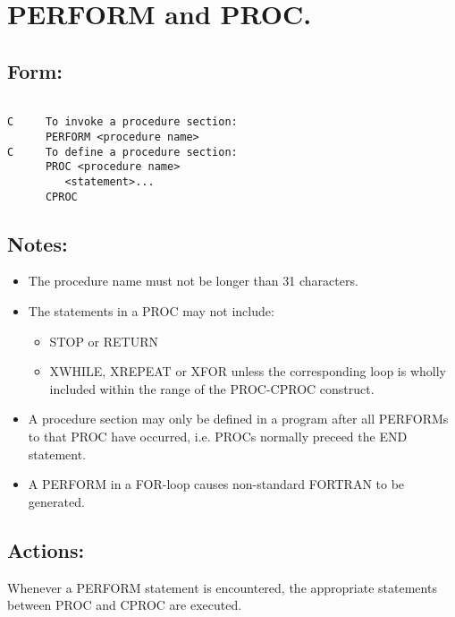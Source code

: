 \section{PERFORM and PROC.}
\subsection{Form:}
\begin{verbatim}

C     To invoke a procedure section: 
      PERFORM <procedure name> 
C     To define a procedure section: 
      PROC <procedure name>
         <statement>... 
      CPROC 

\end{verbatim}
\subsection{Notes:}
\begin{itemize}

\item The procedure name must not be longer than 31 characters. 

\item The statements in a PROC may not include:

\begin{itemize}

\item STOP or RETURN

\item XWHILE, XREPEAT or XFOR unless the corresponding loop is wholly
included within the range of the PROC-CPROC construct. 

\end{itemize}

\item A procedure section may only be defined in a program after all
PERFORMs to that PROC have occurred, i.e.  PROCs normally preceed the
END statement. 

\item A PERFORM in a FOR-loop causes non-standard FORTRAN to be
generated. 

\end{itemize}
\subsection{Actions:}

Whenever a PERFORM statement is encountered, the appropriate statements
between PROC and CPROC are executed. 

